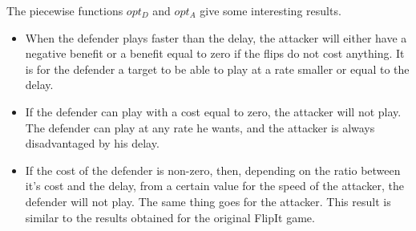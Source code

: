 The piecewise functions $opt_{D}$ and $opt_{A}$ give some interesting results. 

\begin{itemize}
\item When the defender plays faster than the delay, the attacker will either have a negative benefit or a benefit equal to zero if the flips do not cost anything. It is for the defender a target to be able to play at a rate smaller or equal to the delay.
\item If the defender can play with a cost equal to zero, the attacker will not play. The defender can play at any rate he wants, and the attacker is always disadvantaged by his delay.
\item If the cost of the defender is non-zero, then, depending on the ratio between it's cost and the delay, from a certain value for the speed of the attacker, the defender will not play. The same thing goes for the attacker. This result is similar to the results obtained for the original FlipIt game.
\end{itemize}

